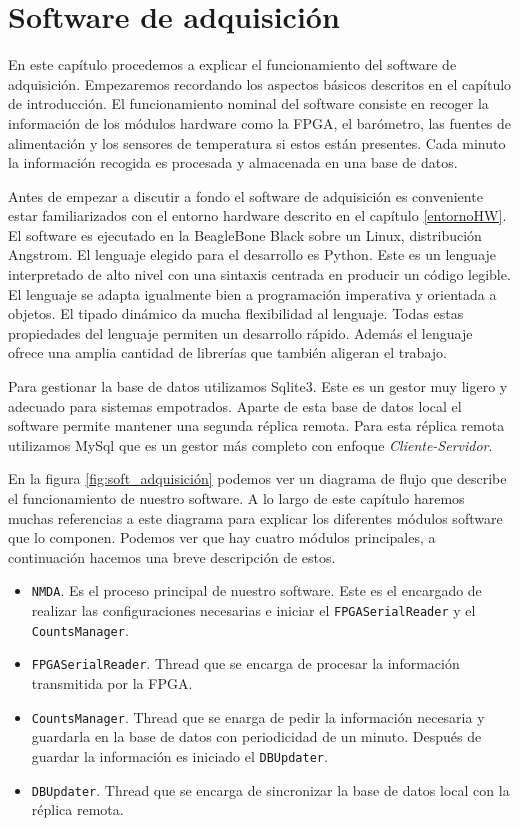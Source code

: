 \chapter{Software de adquisición}
\label{cap2}
En este capítulo procedemos a explicar el funcionamiento del software de adquisición. Empezaremos recordando los aspectos básicos descritos en el
capítulo de introducción. El funcionamiento nominal del software consiste en recoger la información de los módulos hardware como la FPGA, el
barómetro, las fuentes de alimentación y los sensores de temperatura si estos están presentes. Cada minuto la información recogida es procesada y
almacenada en una base de datos. 
\par
Antes de empezar a discutir a fondo el software de adquisición es conveniente estar familiarizados con el entorno hardware descrito en el capítulo
\ref{entornoHW}. El software es ejecutado en la BeagleBone Black sobre un Linux, distribución Angstrom. El lenguaje elegido para el desarrollo es
Python\cite{Python}. Este  es un lenguaje interpretado de alto nivel con una sintaxis centrada en producir un código legible. El lenguaje se adapta
igualmente bien a programación imperativa y orientada a objetos. El tipado dinámico da mucha flexibilidad al lenguaje. Todas estas propiedades del
lenguaje permiten un desarrollo rápido. Además el lenguaje ofrece una amplia cantidad de librerías que también aligeran el trabajo. 
\par
Para gestionar la base de datos utilizamos Sqlite3\cite{Sqlite}. Este es un gestor muy ligero y adecuado para sistemas empotrados. Aparte de esta base
de datos local el software permite mantener una segunda réplica remota. Para esta réplica remota utilizamos MySql\cite{MySql} que es un gestor más
completo con enfoque \emph{Cliente-Servidor}.
\par
En la figura \ref{fig:soft_adquisición} podemos ver un diagrama de flujo que describe el funcionamiento de nuestro software. A lo largo de este
capítulo haremos muchas referencias a este diagrama para explicar los diferentes módulos software que lo componen. Podemos ver que hay cuatro módulos
principales, a continuación hacemos una breve descripción de estos. 
\begin{itemize}
  	\item	\texttt{NMDA}. Es el proceso principal de nuestro software. Este es el encargado de realizar las configuraciones necesarias e iniciar
	  	el \texttt{FPGASerialReader} y el \texttt{CountsManager}.
	\item	\texttt{FPGASerialReader}. Thread que se encarga de procesar la información transmitida por la FPGA.
	\item	\texttt{CountsManager}. Thread que se enarga de pedir la información necesaria y guardarla en la base de datos con periodicidad de un
	  	minuto. Después de guardar la información es iniciado el \texttt{DBUpdater}.
	\item	\texttt{DBUpdater}. Thread que se encarga de sincronizar la base de datos local con la réplica remota.
\end{itemize}

